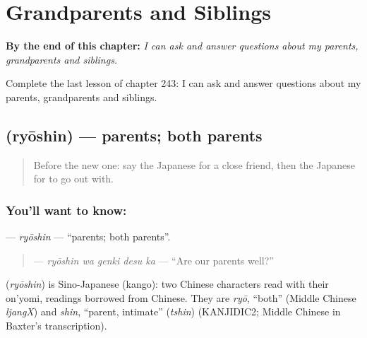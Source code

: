 
\chapter{Grandparents and Siblings}
\label{ch:ja-grandparents-and-siblings}

\begin{chapteropening}
\textbf{By the end of this chapter:} \emph{I can ask and answer questions about my parents, grandparents and siblings.}

Complete the last lesson of chapter 243: I can ask and answer questions about my parents, grandparents and siblings.
\end{chapteropening}

\section[\texorpdfstring{\ja{りょうしん} (ryōshin)}{りょうしん (ryōshin)}]{ (ryōshin) — parents; both parents}

\label{lesson:JA-C243-ryoushin}



\begin{quote}
Before the new one: say the Japanese for a close friend, then the Japanese for to go out with.
\end{quote}

\subsection*{You'll want to know: }
\textbf{} — \emph{ryōshin} — \textquotedblleft{}parents; both parents\textquotedblright{}.

\begin{quote}
\textbf{ } — \emph{ryōshin wa genki desu ka} — \textquotedblleft{}Are our parents well?\textquotedblright{}
\end{quote}

\begin{cousinweb}
\textbf{} (\emph{ryōshin}) is Sino-Japanese (kango): two Chinese characters read with their on'yomi, readings borrowed from Chinese. They are \emph{ryō}, \textquotedblleft{}both\textquotedblright{} (Middle Chinese \emph{ljangX}) and \emph{shin}, \textquotedblleft{}parent, intimate\textquotedblright{} (\emph{tshin}) (KANJIDIC2; Middle Chinese in Baxter's transcription).
\end{cousinweb}

